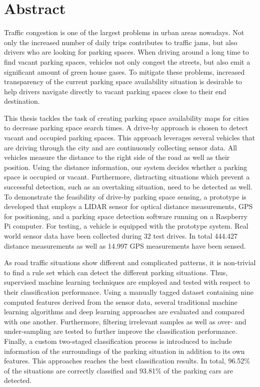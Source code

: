 

\chapter*{Abstract}

Traffic congestion is one of the largest problems in urban areas nowadays. Not only the increased number of daily trips contributes to traffic jams, but also drivers who are looking for parking spaces. When driving around a long time to find vacant parking spaces, vehicles not only congest the streets, but also emit a significant amount of green house gases. To mitigate these problems, increased transparency of the current parking space availability situation is desirable to help drivers navigate directly to vacant parking spaces close to their end destination. 

This thesis tackles the task of creating parking space availability maps for cities to decrease parking space search times. A drive-by approach is chosen to detect vacant and occupied parking spaces. This approach leverages several vehicles that are driving through the city and are continuously collecting sensor data. All vehicles measure the distance to the right side of the road as well as their position. Using the distance information, our system decides whether a parking space is occupied or vacant. Furthermore, distracting situations which prevent a successful detection, such as an overtaking situation, need to be detected as well. 
To demonstrate the feasibility of drive-by parking space sensing, a prototype is developed that employs a LIDAR sensor for optical distance measurements, GPS for positioning, and a parking space detection software running on a Raspberry Pi computer.
For testing, a vehicle is equipped with the prototype system. Real world sensor data have been collected during 32 test drives. In total 444.427 distance measurements as well as 14.997 GPS measurements have been sensed.

As road traffic situations show different and complicated patterns, it is non-trivial to find a rule set which can detect the different parking situations. Thus, supervised machine learning techniques are employed and tested with respect to their classification performance. Using a manually tagged dataset containing nine computed features derived from the sensor data, several traditional machine learning algorithms and deep learning approaches are evaluated and compared with one another. Furthermore, filtering irrelevant samples as well as over- and under-sampling are tested to further improve the classification performance. 
Finally, a custom two-staged classification process is introduced to include information of the surroundings of the parking situation in addition to its own features. This approaches reaches the best classification results. In total, 96.52\% of the situations are correctly classified and 93.81\% of the parking cars are detected.


